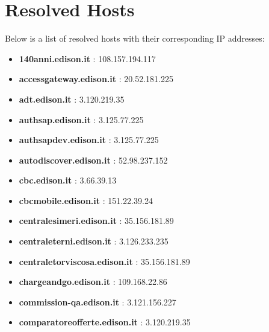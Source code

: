 \documentclass{article}
\begin{document}
\clearpage

\section{Resolved Hosts}

Below is a list of resolved hosts with their corresponding IP addresses:

\begin{itemize}
    
        
            \item \textbf{ 140anni.edison.it }: 108.157.194.117
        
            \item \textbf{ accessgateway.edison.it }: 20.52.181.225
        
            \item \textbf{ adt.edison.it }: 3.120.219.35
        
            \item \textbf{ authsap.edison.it }: 3.125.77.225
        
            \item \textbf{ authsapdev.edison.it }: 3.125.77.225
        
            \item \textbf{ autodiscover.edison.it }: 52.98.237.152
        
            \item \textbf{ cbc.edison.it }: 3.66.39.13
        
            \item \textbf{ cbcmobile.edison.it }: 151.22.39.24
        
            \item \textbf{ centralesimeri.edison.it }: 35.156.181.89
        
            \item \textbf{ centraleterni.edison.it }: 3.126.233.235
        
            \item \textbf{ centraletorviscosa.edison.it }: 35.156.181.89
        
            \item \textbf{ chargeandgo.edison.it }: 109.168.22.86
        
            \item \textbf{ commission-qa.edison.it }: 3.121.156.227
        
            \item \textbf{ comparatoreofferte.edison.it }: 3.120.219.35
        

\end{itemize}
\end{document}
